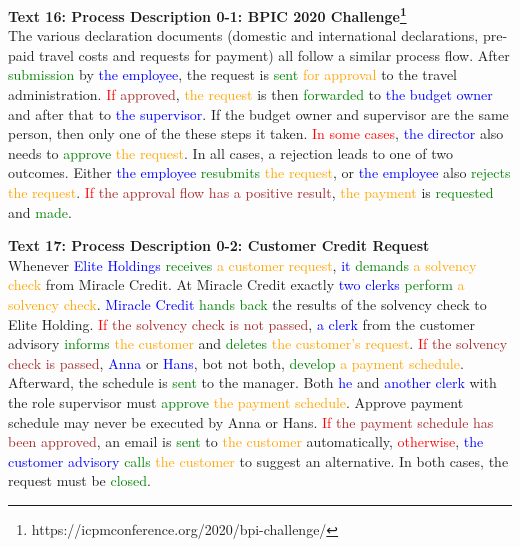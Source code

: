 \textbf{Text 16: Process Description 0-1: BPIC 2020 Challenge\footnote{https://icpmconference.org/2020/bpi-challenge/}}\\
The various declaration documents (domestic and international declarations, pre-paid travel costs and requests for payment) all follow a similar process flow. After \textcolor{green}{submission} by \textcolor{blue}{the employee}, the request is \textcolor{green}{sent} \textcolor{orange}{for approval} to the travel administration. \textcolor{red}{If} \textcolor{brown}{approved}, \textcolor{orange}{the request} is then \textcolor{green}{forwarded} to \textcolor{blue}{the budget owner} and after that to \textcolor{blue}{the supervisor}. If the budget owner and supervisor are the same person, then only one of the these steps it taken. \textcolor{red}{In some cases}, \textcolor{blue}{the director} also needs to \textcolor{green}{approve} \textcolor{orange}{the request}. In all cases, a rejection leads to one of two outcomes. Either \textcolor{blue}{the employee} \textcolor{green}{resubmits} \textcolor{orange}{the request}, or \textcolor{blue}{the employee} also \textcolor{green}{rejects} \textcolor{orange}{the request}. \textcolor{red}{If} \textcolor{brown}{the approval flow has a positive result}, \textcolor{orange}{the payment} is \textcolor{green}{requested} and \textcolor{green}{made}.


\textbf{Text 17: Process Description 0-2: Customer Credit Request}\\
Whenever \textcolor{blue}{Elite Holdings} \textcolor{green}{receives} \textcolor{orange}{a customer request}, \textcolor{blue}{it} \textcolor{green}{demands} \textcolor{orange}{a solvency check} from Miracle Credit. At Miracle Credit exactly \textcolor{blue}{two clerks} \textcolor{green}{perform} \textcolor{orange}{a solvency check}. \textcolor{blue}{Miracle Credit} \textcolor{green}{hands back} the results of the solvency check to Elite Holding. \textcolor{red}{If} \textcolor{brown}{the solvency check is not passed}, \textcolor{blue}{a clerk} from the customer advisory \textcolor{green}{informs} \textcolor{orange}{the customer} and \textcolor{green}{deletes} \textcolor{orange}{the customer's request}. \textcolor{red}{If} \textcolor{brown}{the solvency check is passed}, \textcolor{blue}{Anna} or \textcolor{blue}{Hans}, bot not both, \textcolor{green}{develop} \textcolor{orange}{a payment schedule}. Afterward, the schedule is \textcolor{green}{sent} to the manager. Both \textcolor{blue}{he} and \textcolor{blue}{another clerk} with the role supervisor must \textcolor{green}{approve} \textcolor{orange}{the payment schedule}. Approve payment schedule may never be executed by Anna or Hans. \textcolor{red}{If} \textcolor{brown}{the payment schedule has been approved}, an email is \textcolor{green}{sent} to \textcolor{orange}{the customer} automatically, \textcolor{red}{otherwise}, \textcolor{blue}{the customer advisory} \textcolor{green}{calls} \textcolor{orange}{the customer} to suggest an alternative. In both cases, the request must be \textcolor{green}{closed}.


